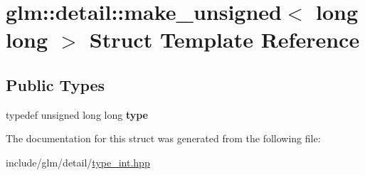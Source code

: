 \hypertarget{structglm_1_1detail_1_1make__unsigned_3_01long_01long_01_4}{}\section{glm\+:\+:detail\+:\+:make\+\_\+unsigned$<$ long long $>$ Struct Template Reference}
\label{structglm_1_1detail_1_1make__unsigned_3_01long_01long_01_4}
\subsection*{Public Types}
\begin{DoxyCompactItemize}
\item 
\mbox{\label{structglm_1_1detail_1_1make__unsigned_3_01long_01long_01_4_adb9a738bcdd4b53058383168bb8585b1}} 
typedef unsigned long long {\bfseries type}
\end{DoxyCompactItemize}


The documentation for this struct was generated from the following file\+:\begin{DoxyCompactItemize}
\item 
include/glm/detail/\hyperlink{type__int_8hpp}{type\+\_\+int.\+hpp}\end{DoxyCompactItemize}
